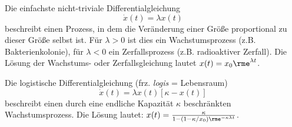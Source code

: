 \documentclass[a4paper,10pt]{article}
\begin{document}
Die einfachste nicht-triviale Differentialgleichung
\[
\dot{x}(t)=\lambda x(t)
\]
beschreibt einen Prozess, in dem die Veränderung einer Größe proportional
zu dieser Größe selbst ist.
Für $\lambda>0$ ist dies ein Wachstumsprozess (z.B. Bakterienkolonie), für $\lambda<0$ ein Zerfallsprozess (z.B. radioaktiver Zerfall). Die Lösung der Wachstums- oder Zerfallsgleichung lautet $x(t)=x_0 \rme^{\lambda t}$.

Die logistische Differentialgleichung (frz. {\em logis} = Lebensraum)
\[
\dot{x}(t)=\lambda x(t) \left[ \kappa - x(t)\right]
\]
beschreibt einen durch eine endliche Kapazität $\kappa$ beschränkten
Wachstumsprozess.
Die Lösung lautet:
$x(t)=\frac{\kappa}{1-(1-\kappa/x_0)\rme^{-\kappa\lambda t}}$.\\%

%
%
\end{document}
